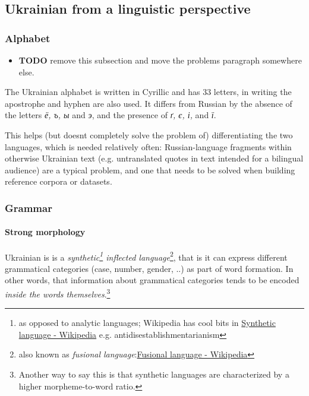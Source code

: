 \subsection{Ukrainian from a linguistic
perspective}\label{ukrainian-from-a-linguistic-perspective}

\subsubsection{Alphabet}\label{alphabet}

\begin{itemize}
\tightlist
\item
  \textbf{TODO} remove this subsection and move the problems paragraph
  somewhere else.
\end{itemize}

The Ukrainian alphabet is written in Cyrillic and has 33 letters, in
writing the apostrophe and hyphen are also used. It differs from Russian
by the absence of the letters \emph{ё, ъ, ы} and \emph{э}, and the
presence of \emph{ґ, є, і,} and \emph{ї}.

This helps (but doesn\textquotesingle t completely solve the problem of)
differentiating the two languages, which is needed relatively often:
Russian-language fragments within otherwise Ukrainian text (e.g.
untranslated quotes in text intended for a bilingual audience) are a
typical problem, and one that needs to be solved when building reference
corpora or datasets.\cite{9648705}

\subsubsection{Grammar}\label{grammar}

\paragraph{Strong morphology}\label{strong-morphology}

Ukrainian is is a \emph{synthetic\footnote{as opposed to analytic
  languages; Wikipedia has cool bits in
  \href{https://en.wikipedia.org/wiki/Synthetic_language}{Synthetic
  language - Wikipedia} e.g. antidisestablishmentarianism} inflected
language}\footnote{also known as \emph{fusional
  language}:\href{https://en.wikipedia.org/wiki/Fusional_language}{Fusional
  language - Wikipedia}}, that is it can express different grammatical
categories (case, number, gender, ..) as part of word formation. In
other words, that information about grammatical categories tends to be
encoded \emph{inside the words themselves}.\footnote{Another way to say
  this is that synthetic languages are characterized by a higher
  morpheme-to-word ratio.}

